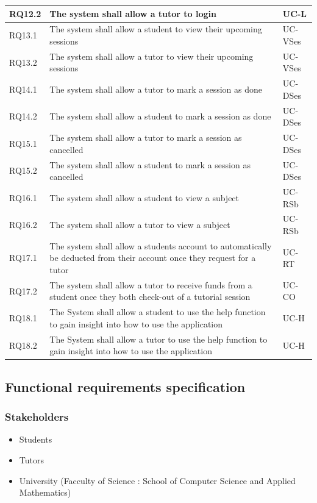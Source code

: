 \documentclass[12pt]{article}
\begin{document}
{\begin{longtable}{| l | p{10cm}| l |}
				RQ12.2 & The system shall allow a tutor to login &UC-L\\ \hline
				RQ13.1 & The system shall allow a student to view their upcoming sessions  &UC-VSes\\ \hline
				RQ13.2 & The system shall allow a tutor to view their upcoming sessions  &UC-VSes\\ \hline
				RQ14.1 & The system shall allow a tutor to mark a session as done &UC-DSes\\ \hline
				RQ14.2 & The system shall allow a student to mark a session as done &UC-DSes\\ \hline
				RQ15.1 & The system shall allow a tutor to mark a session as cancelled &UC-DSes\\ \hline
				RQ15.2 & The system shall allow a student to mark a session as cancelled &UC-DSes\\ \hline
				RQ16.1 & The system shall allow a student to view a subject &UC-RSb\\ \hline
				RQ16.2 & The system shall allow a tutor to view a subject &UC-RSb\\ \hline
				RQ17.1 & The system shall allow a students account to automatically be deducted from their account once they request for a tutor  &UC-RT\\ \hline
				RQ17.2 & The system shall allow a tutor to receive funds from a student once they both check-out of a tutorial session &UC-CO\\ \hline
				RQ18.1 & The System shall allow a student to use the help function to gain insight into how to use the application & UC-H\\ \hline
						RQ18.2 & The System shall allow a tutor to use the help function to gain insight into how to use the application & UC-H\\ \hline
\end{longtable}
}
\newpage
\subsection{Functional requirements specification}
\subsubsection{Stakeholders}
\begin{itemize}
\item Students
\item Tutors
\item University (Facculty of Science : School of Computer Science and Applied Mathematics)
\end{itemize}
\end{document}
